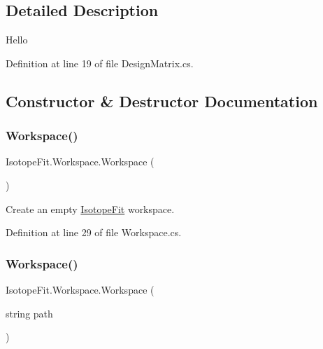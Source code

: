 \subsection{Detailed Description}
Hello 



Definition at line 19 of file Design\+Matrix.\+cs.



\subsection{Constructor \& Destructor Documentation}
\mbox{\label{class_isotope_fit_1_1_workspace_affa8b6ac937cee367c225c606782da17}} 
\subsubsection{\texorpdfstring{Workspace()}{Workspace()}\hspace{0.1cm}{\footnotesize\ttfamily [1/2]}}
{\footnotesize\ttfamily Isotope\+Fit.\+Workspace.\+Workspace (\begin{DoxyParamCaption}{ }\end{DoxyParamCaption})}



Create an empty \hyperlink{namespace_isotope_fit}{Isotope\+Fit} workspace. 



Definition at line 29 of file Workspace.\+cs.

\mbox{\label{class_isotope_fit_1_1_workspace_a5aa1f6546513d331f262d383fe6b0358}} 
\subsubsection{\texorpdfstring{Workspace()}{Workspace()}\hspace{0.1cm}{\footnotesize\ttfamily [2/2]}}
{\footnotesize\ttfamily Isotope\+Fit.\+Workspace.\+Workspace (\begin{DoxyParamCaption}\item[{string}]{path }\end{DoxyParamCaption})}



